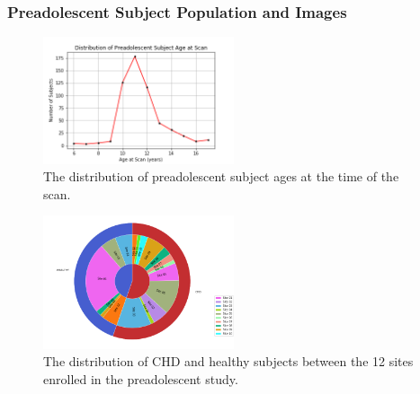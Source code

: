\subsubsection{Preadolescent Subject Population and Images}

\begin{figure}
\centering
\includegraphics[width=0.5\textwidth]{5/demo_pread_scan_age.png}
\caption{The distribution of preadolescent subject ages at the time of the scan.}
\label{fig:pread_sites}
\end{figure}

\begin{figure}
\centering
\includegraphics[width=0.5\textwidth]{5/demo_pread_subj_cohort.png}
\caption{The distribution of CHD and healthy subjects between the 12 sites enrolled in the preadolescent study.}
\label{fig:pread_ages}
\end{figure}

